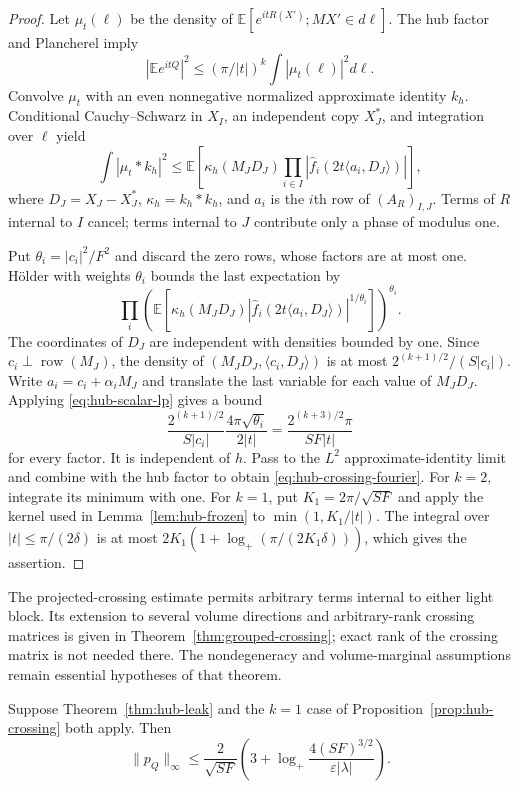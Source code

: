 \begin{proof}
Let $\mu_t(\ell)$ be the density of
$\mathbb E[e^{itR(X')};MX'\in d\ell]$.
The hub factor and Plancherel imply
\[
 |\mathbb E e^{itQ}|^2\le(\pi/|t|)^k\int|\mu_t(\ell)|^2d\ell.
\]
Convolve $\mu_t$ with an even nonnegative normalized approximate
identity $k_h$.  Conditional Cauchy--Schwarz in $X_I$, an independent
copy $X_J^*$, and integration over $\ell$ yield
\[
 \int|\mu_t*k_h|^2\le
 \mathbb E\left[\kappa_h(M_JD_J)
       \prod_{i\in I}|\widehat f_i(2t\langle a_i,D_J\rangle)|\right],
\]
where $D_J=X_J-X_J^*$, $\kappa_h=k_h*k_h$, and $a_i$ is the
$i$th row of $(A_R)_{I,J}$.  Terms of $R$ internal to $I$ cancel;
terms internal to $J$ contribute only a phase of modulus one.

Put $\theta_i=|c_i|^2/F^2$ and discard the zero rows, whose factors
are at most one.  H\"older with weights $\theta_i$ bounds the last
expectation by
\[
 \prod_i\left(\mathbb E\left[\kappa_h(M_JD_J)
 |\widehat f_i(2t\langle a_i,D_J\rangle)|^{1/\theta_i}\right]
                                                   \right)^{\theta_i}.
\]
The coordinates of $D_J$ are independent with densities bounded by
one.  Since $c_i\perp\operatorname{row}(M_J)$, the density of
$(M_JD_J,\langle c_i,D_J\rangle)$ is at most
$2^{(k+1)/2}/(S|c_i|)$.
Write $a_i=c_i+\alpha_iM_J$ and translate the last variable for each
value of $M_JD_J$.  Applying \eqref{eq:hub-scalar-lp} gives a bound
\[
 \frac{2^{(k+1)/2}}{S|c_i|}\frac{4\pi\sqrt{\theta_i}}{2|t|}
 =\frac{2^{(k+3)/2}\pi}{SF|t|}
\]
for every factor.  It is independent of $h$.
Pass to the $L^2$ approximate-identity limit and combine with the
hub factor to obtain \eqref{eq:hub-crossing-fourier}.
For $k=2$, integrate its minimum with one.
For $k=1$, put $K_1=2\pi/\sqrt{SF}$ and apply the kernel used in
Lemma~\ref{lem:hub-frozen} to
$\min(1,K_1/|t|)$.  The integral over
$|t|\le\pi/(2\delta)$ is at most
$2K_1(1+\log_+(\pi/(2K_1\delta)))$, which gives the assertion.
\end{proof}

\begin{remark}
The projected-crossing estimate permits arbitrary terms internal to
either light block.  Its extension to several volume directions and
arbitrary-rank crossing matrices is given in
Theorem~\ref{thm:grouped-crossing}; exact rank of the crossing matrix
is not needed there.  The nondegeneracy and volume-marginal assumptions
remain essential hypotheses of that theorem.
\end{remark}

\begin{corollary}
\label{cor:hub-diagonal-log}
Suppose Theorem~\ref{thm:hub-leak} and the $k=1$ case of
Proposition~\ref{prop:hub-crossing} both apply.  Then
\[
 \|p_Q\|_\infty\le
 \frac{2}{\sqrt{SF}}
 \left(3+\log_+\frac{4(SF)^{3/2}}{\varepsilon|\lambda|}\right).
\]
\end{corollary}

